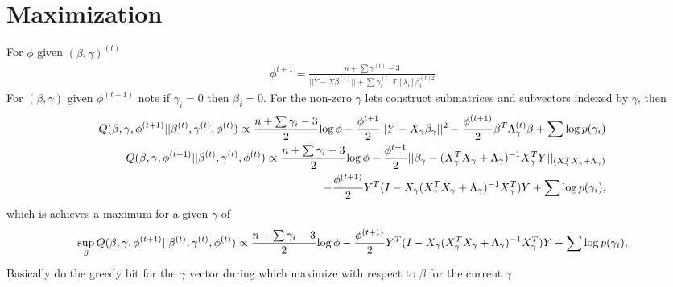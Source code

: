 \documentclass[6pt]{article}
\def\log{{\rm log \,}}
\begin{document}
\section{Maximization}
For $\phi$ given $(\beta,\gamma)^{(t)}$\\
\begin{align*}
	\phi^{t+1}=\frac{n+\sum\gamma^{(t)}-3}{||Y-X\beta^{(t)}||+\sum \gamma_{i}^{(t)}\mathbb{E}\left[ \lambda_{i} \right]\beta_{i}^{(t)2}}
\end{align*}
For $(\beta,\gamma)$ given $\phi^{(t+1)}$ note if $\gamma_{i}=0$ then $\beta_{i}=0$. For the non-zero $\gamma$ lets construct submatrices and subvectors indexed by $\gamma$, then 
\begin{align*}
	Q(\beta,\gamma,\phi^{(t+1)}||\beta^{(t)},\gamma^{(t)},\phi^{(t)})\propto \frac{n+\sum \gamma_{i}-3}{2}\log \phi -\frac{\phi^{t+1}}{2}||Y-X_{\gamma}\beta_{\gamma}||^{2}-\frac{\phi^{(t+1)}}{2}\beta^{T}\Lambda_{\gamma}^{(t)}\beta + \sum \log p(\gamma_{i})\\
	Q(\beta,\gamma,\phi^{(t+1)}||\beta^{(t)},\gamma^{(t)},\phi^{(t)})\propto \frac{n+\sum \gamma_{i}-3}{2}\log \phi -\frac{\phi^{t+1}}{2}||\beta_{\gamma}-(X_{\gamma}^{T}X_{\gamma}+\Lambda_{\gamma})^{-1}X_{\gamma}^{T}Y||_{(X_{\gamma}^{T}X_{\gamma}+\Lambda_{\gamma})}\\-\frac{\phi^{(t+1)}}{2}Y^{T}(I-X_{\gamma}(X_{\gamma}^{T}X_{\gamma}+\Lambda_{\gamma})^{-1}X_{\gamma}^{T})Y + \sum \log p(\gamma_{i}),
\end{align*}
which is achieves a maximum for a given $\gamma$ of
\begin{align*}
	\sup_{\beta}	Q(\beta,\gamma,\phi^{(t+1)}||\beta^{(t)},\gamma^{(t)},\phi^{(t)})\propto \frac{n+\sum \gamma_{i}-3}{2}\log \phi -\frac{\phi^{(t+1)}}{2}Y^{T}(I-X_{\gamma}(X_{\gamma}^{T}X_{\gamma}+\Lambda_{\gamma})^{-1}X_{\gamma}^{T})Y + \sum \log p(\gamma_{i}),
\end{align*}
Basically do the greedy bit for the $\gamma$ vector during which maximize with respect to $\beta$ for the current $\gamma$
\end{document}
